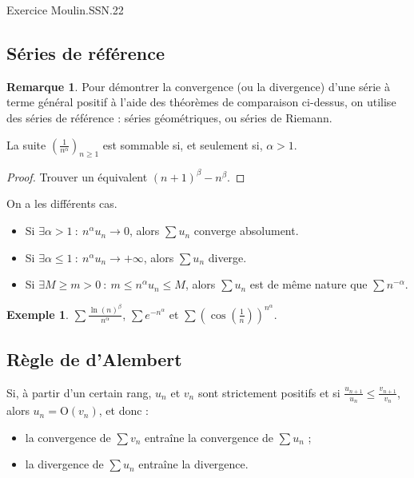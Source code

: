 \documentclass[french]{article}
\renewcommand{\O}{\text{O}}
\theoremstyle{plain}
\theoremstyle{definition}
\newtheorem*{ex}{Exemple}
\newtheorem*{rmq}{Remarque}
\theoremstyle{remark}
\begin{document}
Exercice Moulin.SSN.22

\subsection{Séries de référence}

\begin{rmq}
	Pour démontrer la convergence (ou la divergence) d'une série à terme général positif à l'aide des théorèmes de comparaison ci-dessus, on utilise des séries de référence : séries géométriques, ou séries de Riemann.
\end{rmq}

\begin{prop}%
	La suite $\displaystyle\left(\frac{1}{n^\alpha}\right)_{n\geqslant 1}$ est sommable si, et seulement si, $\alpha >1$.
\end{prop}
\begin{proof}
	Trouver un équivalent $(n+1)^\beta-n^\beta$.
\end{proof}

\begin{met}
	On a les différents cas.
	\begin{itemize}
		\item Si $\exists\alpha >1 \ : \ n^\alpha u_n\to 0$, alors $\sum u_n$ converge absolument.
		\item Si $\exists\alpha \leqslant1 \ : \ n^\alpha u_n\to+\infty$, alors $\sum u_n$ diverge.
		\item Si $\exists M\geqslant m>0\ : \ m\leqslant n^\alpha u_n\leqslant M$, alors $\sum u_n$ est de même nature que $\sum n^{-\alpha}$.
	\end{itemize}
\end{met}

\begin{ex}
	$\displaystyle\sum\frac{\ln(n)^\beta}{n^\alpha}$, $\displaystyle\sum e^{-n^\alpha}$ et $\displaystyle\sum\left(\cos\left(\frac{1}{n}\right)\right)^{n^\alpha}$.
\end{ex}

\subsection{Règle de d'Alembert}

\begin{prop}%
	Si, à partir d'un certain rang, $u_n$ et $v_n$ sont strictement positifs et si $\displaystyle\frac{u_{n+1}}{u_n}\leqslant\frac{v_{n+1}}{v_n}$, alors $u_n=\O(v_n)$, et donc :
	\begin{itemize}
		\item la convergence de $\displaystyle\sum v_n$ entraîne la convergence de $\displaystyle\sum u_n$ ;
		\item la divergence de $\displaystyle\sum u_n$ entraîne la divergence.
	\end{itemize}
\end{prop}
\end{document}
